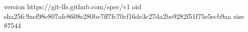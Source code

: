 version https://git-lfs.github.com/spec/v1
oid sha256:9aef98e807afe8608e280bc7ff7fc70cf16de3c27da2be9282f51f75e5ecb9aa
size 87544
